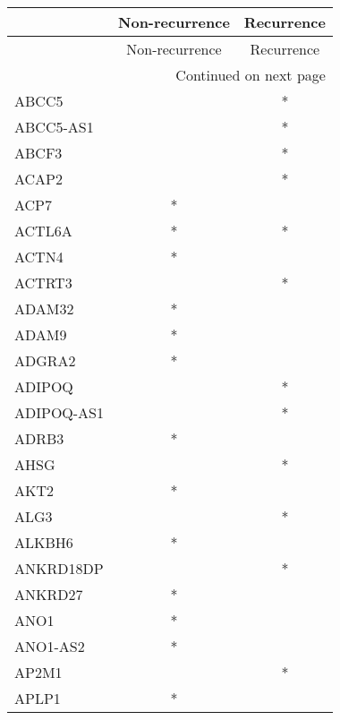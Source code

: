 \begin{longtable}{lcc}
\toprule
{} & Non-recurrence & Recurrence \\
\midrule
\endfirsthead

\toprule
{} & Non-recurrence & Recurrence \\
\midrule
\endhead
\midrule
\multicolumn{3}{r}{{Continued on next page}} \\
\midrule
\endfoot

\bottomrule
\endlastfoot
ABCC5            &                &          * \\
ABCC5-AS1        &                &          * \\
ABCF3            &                &          * \\
ACAP2            &                &          * \\
ACP7             &              * &            \\
ACTL6A           &              * &          * \\
ACTN4            &              * &            \\
ACTRT3           &                &          * \\
ADAM32           &              * &            \\
ADAM9            &              * &            \\
ADGRA2           &              * &            \\
ADIPOQ           &                &          * \\
ADIPOQ-AS1       &                &          * \\
ADRB3            &              * &            \\
AHSG             &                &          * \\
AKT2             &              * &            \\
ALG3             &                &          * \\
ALKBH6           &              * &            \\
ANKRD18DP        &                &          * \\
ANKRD27          &              * &            \\
ANO1             &              * &            \\
ANO1-AS2         &              * &            \\
AP2M1            &                &          * \\
APLP1            &              * &            \\

\end{longtable}
